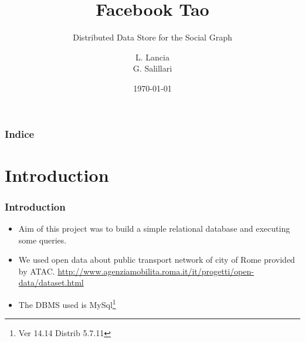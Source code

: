 \documentclass{beamer}
\title[Fb Tao]{Facebook Tao}
\subtitle{Distributed Data Store for the Social Graph}
\author[L. Lancia \& G. Salillari]{
  L. Lancia \\ G. Salillari
  }
\institute[Sapienza Università di Roma]{
Cloud Computing\\
  Master Degree in Data Science \\
  Sapienza Università di Roma}
\date[\today]{
 \today}
\begin{document}
\begin{frame}
  \titlepage
\end{frame}

\begin{frame}
  \frametitle{Indice}

  \tableofcontents
\end{frame}

\section{Introduction}
\begin{frame}
  \frametitle{Introduction}
  \begin{itemize}
  \item Aim of this project was to build a simple relational database
    and executing some queries.

    \item We used open data about public transport network of city of Rome
    provided by ATAC. \url{http://www.agenziamobilita.roma.it/it/progetti/open-data/dataset.html}
  
   \item The DBMS used is MySql\footnote{Ver 14.14 Distrib 5.7.11}
  \end{itemize}

 \end{frame}
\end{document}
